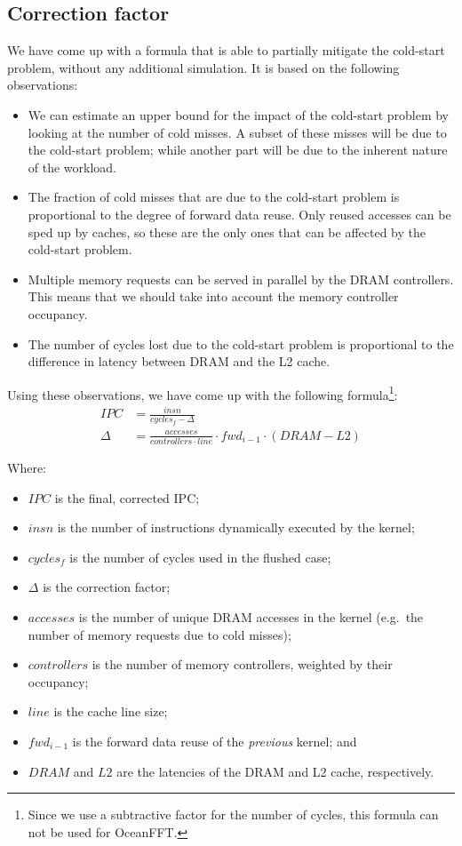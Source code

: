 \documentclass[5p,numvwe]{elsarticle}
\begin{document}
    \subsection{Correction factor}\label{subsec:mitig-corr}
    We have come up with a formula that is able to partially mitigate the cold-start problem, without any additional simulation.
    It is based on the following observations:
    \begin{itemize}
        \item We can estimate an upper bound for the impact of the cold-start problem by looking at the number of cold misses.
        A subset of these misses will be due to the cold-start problem; while another part will be due to the inherent nature of the workload.
        \item The fraction of cold misses that are due to the cold-start problem is proportional to the degree of forward data reuse.
        Only reused accesses can be sped up by caches, so these are the only ones that can be affected by the cold-start problem.
        \item Multiple memory requests can be served in parallel by the DRAM controllers.
        This means that we should take into account the memory controller occupancy.
        \item The number of cycles lost due to the cold-start problem is proportional to the difference in latency between DRAM and the L2 cache.
    \end{itemize}

    Using these observations, we have come up with the following formula\footnote{Since we use a subtractive factor for the number of cycles, this formula can not be used for OceanFFT.}:
    \begin{align}
        IPC &= \frac{insn}{cycles_f - \Delta} \\
        \Delta &= \frac{accesses}{controllers \cdot line} \cdot fwd_{i-1} \cdot (DRAM - L2)
    \end{align}

    Where:
    \begin{itemize}
        \item $IPC$ is the final, corrected IPC;
        \item $insn$ is the number of instructions dynamically executed by the kernel;
        \item $cycles_f$ is the number of cycles used in the flushed case;
        \item $\Delta$ is the correction factor;
        \item $accesses$ is the number of unique DRAM accesses in the kernel (e.g.\ the number of memory requests due to cold misses);
        \item $controllers$ is the number of memory controllers, weighted by their occupancy;
        \item $line$ is the cache line size;
        \item $fwd_{i-1}$ is the forward data reuse of the \textit{previous} kernel; and
        \item $DRAM$ and $L2$ are the latencies of the DRAM and L2 cache, respectively.
    \end{itemize}
\end{document}
